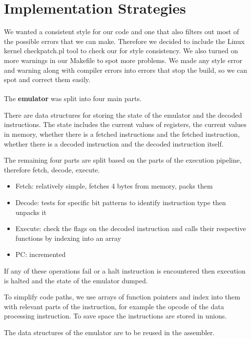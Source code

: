 \documentclass[11pt]{article}
\begin{document}
\section{Implementation Strategies}

We wanted a consistent style for our code and one that also filters out most of
the possible errors that we can make. Therefore we decided to include the Linux
kernel checkpatch.pl tool to check our for style consistency. We also turned on
more warnings in our Makefile to spot more problems. We made any style error and
warning along with compiler errors into errors that stop the build, so we can
spot and correct them easily. \\ \\

The \textbf{emulator} was split into four main parts.

There are data structures for storing the state of the emulator and the
decoded instructions. The state includes the current values of registers, the
current values in memory, whether there is a fetched instructions and the
fetched instruction, whether there is a decoded instruction and the decoded
instruction itself.

The remaining four parts are split based on the parts of the execution pipeline,
therefore fetch, decode, execute.

\begin{itemize}[noitemsep,topsep=0pt]
    \item Fetch: relatively simple, fetches 4 bytes from memory, packs them
    \item Decode: tests for specific bit patterns to identify instruction type
      then unpacks it
    \item Execute: check the flags on the decoded instruction and calls their
      respective functions by indexing into an array
    \item PC: incremented
\end{itemize}

If any of these operations fail or a halt instruction is encountered then
execution is halted and the state of the emulator dumped.

To simplify code paths, we use arrays of function pointers and index into them
with relevant parts of the instruction, for example the opcode of the data
processing instruction. To save space the instructions are stored in unions.

The data structures of the emulator are to be reused in the assembler. \\
\end{document}
